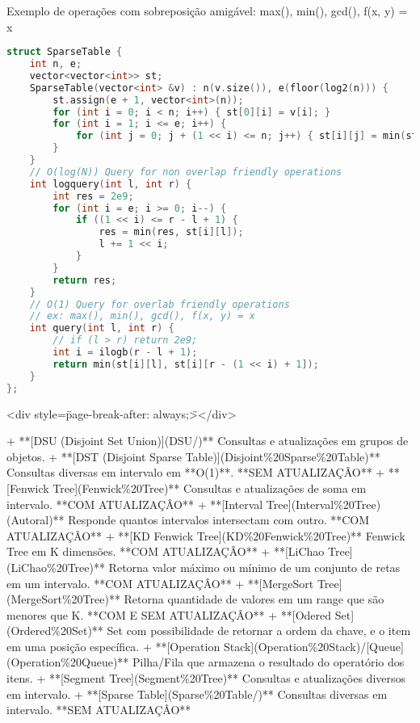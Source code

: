 \documentclass[11pt, a4paper, twoside]{article}
\begin{document}
Exemplo de operações com sobreposição amigável: max(), min(), gcd(), f(x, y) = x



\begin{lstlisting}[language=C++]
struct SparseTable {
    int n, e;
    vector<vector<int>> st;
    SparseTable(vector<int> &v) : n(v.size()), e(floor(log2(n))) {
        st.assign(e + 1, vector<int>(n));
        for (int i = 0; i < n; i++) { st[0][i] = v[i]; }
        for (int i = 1; i <= e; i++) {
            for (int j = 0; j + (1 << i) <= n; j++) { st[i][j] = min(st[i - 1][j], st[i - 1][j + (1 << (i - 1))]); }
        }
    }
    // O(log(N)) Query for non overlap friendly operations
    int logquery(int l, int r) {
        int res = 2e9;
        for (int i = e; i >= 0; i--) {
            if ((1 << i) <= r - l + 1) {
                res = min(res, st[i][l]);
                l += 1 << i;
            }
        }
        return res;
    }
    // O(1) Query for overlab friendly operations
    // ex: max(), min(), gcd(), f(x, y) = x
    int query(int l, int r) {
        // if (l > r) return 2e9;
        int i = ilogb(r - l + 1);
        return min(st[i][l], st[i][r - (1 << i) + 1]);
    }
};
\end{lstlisting}

<div style=\"page-break-after: always;\"></div>



+ **[DSU (Disjoint Set Union)](DSU/)**  
Consultas e atualizações em grupos de objetos.
+ **[DST (Disjoint Sparse Table)](Disjoint\%20Sparse\%20Table)**  
Consultas diversas em intervalo em **O(1)**. **SEM ATUALIZAÇÂO**
+ **[Fenwick Tree](Fenwick\%20Tree)**  
Consultas e atualizações de soma em intervalo. **COM ATUALIZAÇÂO**
+ **[Interval Tree](Interval\%20Tree) (Autoral)**  
Responde quantos intervalos intersectam com outro. **COM ATUALIZAÇÂO**
+ **[KD Fenwick Tree](KD\%20Fenwick\%20Tree)**  
Fenwick Tree em K dimensões. **COM ATUALIZAÇÂO**
+ **[LiChao Tree](LiChao\%20Tree)**  
Retorna valor máximo ou mínimo de um conjunto de retas em um intervalo. **COM ATUALIZAÇÂO**
+ **[MergeSort Tree](MergeSort\%20Tree)**  
Retorna quantidade de valores em um range que são menores que K. **COM E SEM ATUALIZAÇÂO**
+ **[Odered Set](Ordered\%20Set)**  
Set com possibilidade de retornar a ordem da chave, e o item em uma posição específica.
+ **[Operation Stack](Operation\%20Stack)/[Queue](Operation\%20Queue)**  
Pilha/Fila que armazena o resultado do operatório dos itens.
+ **[Segment Tree](Segment\%20Tree)**  
Consultas e atualizações diversos em intervalo.
+ **[Sparse Table](Sparse\%20Table/)**  
Consultas diversas em intervalo. **SEM ATUALIZAÇÂO**
\end{document}
